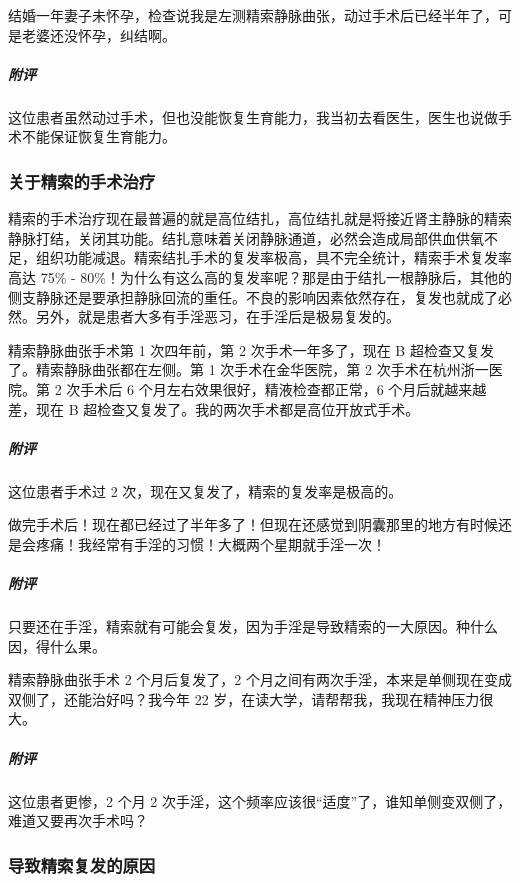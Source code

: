 \begin{case}[精索静脉曲张]
    结婚一年妻子未怀孕，检查说我是左测精索静脉曲张，动过手术后已经半年了，可是老婆还没怀孕，纠结啊。
    \subparagraph{附评} 这位患者虽然动过手术，但也没能恢复生育能力，我当初去看医生，医生也说做手术不能保证恢复生育能力。
\end{case}

\subsubsection{关于精索的手术治疗}

精索的手术治疗现在最普遍的就是高位结扎，高位结扎就是将接近肾主静脉的精索静脉打结，关闭其功能。结扎意味着关闭静脉通道，必然会造成局部供血供氧不足，组织功能减退。精索结扎手术的复发率极高，具不完全统计，精索手术复发率高达 75\% - 80\%！为什么有这么高的复发率呢？那是由于结扎一根静脉后，其他的侧支静脉还是要承担静脉回流的重任。不良的影响因素依然存在，复发也就成了必然。另外，就是患者大多有手淫恶习，在手淫后是极易复发的。

\begin{case}[精索静脉曲张]
    精索静脉曲张手术第 1 次四年前，第 2 次手术一年多了，现在 B 超检查又复发了。精索静脉曲张都在左侧。第 1 次手术在金华医院，第 2 次手术在杭州浙一医院。第 2 次手术后 6 个月左右效果很好，精液检查都正常，6 个月后就越来越差，现在 B 超检查又复发了。我的两次手术都是高位开放式手术。
    \subparagraph{附评} 这位患者手术过 2 次，现在又复发了，精索的复发率是极高的。
\end{case}

\begin{case}[精索静脉曲张]
    做完手术后！现在都已经过了半年多了！但现在还感觉到阴囊那里的地方有时候还是会疼痛！我经常有手淫的习惯！大概两个星期就手淫一次！
    \subparagraph{附评} 只要还在手淫，精索就有可能会复发，因为手淫是导致精索的一大原因。种什么因，得什么果。
\end{case}

\begin{case}[精索静脉曲张]
    精索静脉曲张手术 2 个月后复发了，2 个月之间有两次手淫，本来是单侧现在变成双侧了，还能治好吗？我今年 22 岁，在读大学，请帮帮我，我现在精神压力很大。
    \subparagraph{附评} 这位患者更惨，2 个月 2 次手淫，这个频率应该很“适度”了，谁知单侧变双侧了，难道又要再次手术吗？
\end{case}

\subsubsection{导致精索复发的原因}

